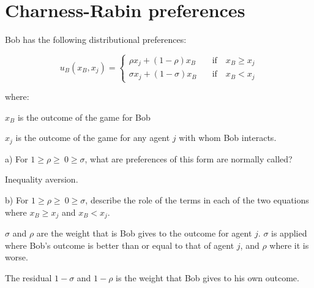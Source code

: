 \documentclass[
  letterpaper,
  DIV=11,
  numbers=noendperiod]{scrreprt}
\begin{document}
\hypertarget{charness-rabin-preferences}{%
\section{Charness-Rabin preferences}\label{charness-rabin-preferences}}

Bob has the following distributional preferences:

\[
u_B(x_B,x_j)=\left\{\begin{matrix}
\rho x_j+(1-\rho)x_B\quad &\textrm{if} \quad x_B \geq x_j \\[6pt]
\sigma x_j+(1-\sigma)x_B \quad &\textrm{if} \quad x_B < x_j 
\end{matrix}\right.
\]

where:

\(x_B\) is the outcome of the game for Bob

\(x_j\) is the outcome of the game for any agent \(j\) with whom Bob
interacts.

a) For \(1\geq \rho \geq\ 0 \geq \sigma\), what are preferences of this
form are normally called?

\begin{tcolorbox}[enhanced jigsaw, title=\textcolor{quarto-callout-tip-color}{\faLightbulb}\hspace{0.5em}{Answer}, toprule=.15mm, colback=white, breakable, titlerule=0mm, colframe=quarto-callout-tip-color-frame, coltitle=black, opacityback=0, rightrule=.15mm, colbacktitle=quarto-callout-tip-color!10!white, bottomtitle=1mm, opacitybacktitle=0.6, arc=.35mm, bottomrule=.15mm, toptitle=1mm, leftrule=.75mm, left=2mm]

Inequality aversion.

\end{tcolorbox}

b) For \(1\geq \rho \geq\ 0 \geq \sigma\), describe the role of the
terms in each of the two equations where \(x_B\geq x_j\) and
\(x_B< x_j\).

\begin{tcolorbox}[enhanced jigsaw, title=\textcolor{quarto-callout-tip-color}{\faLightbulb}\hspace{0.5em}{Answer}, toprule=.15mm, colback=white, breakable, titlerule=0mm, colframe=quarto-callout-tip-color-frame, coltitle=black, opacityback=0, rightrule=.15mm, colbacktitle=quarto-callout-tip-color!10!white, bottomtitle=1mm, opacitybacktitle=0.6, arc=.35mm, bottomrule=.15mm, toptitle=1mm, leftrule=.75mm, left=2mm]

\(\sigma\) and \(\rho\) are the weight that is Bob gives to the outcome
for agent \(j\). \(\sigma\) is applied where Bob's outcome is better
than or equal to that of agent \(j\), and \(\rho\) where it is worse.

The residual \(1-\sigma\) and \(1-\rho\) is the weight that Bob gives to
his own outcome.

\end{tcolorbox}
\end{document}
